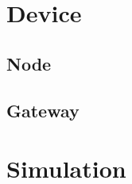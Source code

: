 \section{Device}


\subsection{Node}


\subsection{Gateway}


\section{Simulation}



































